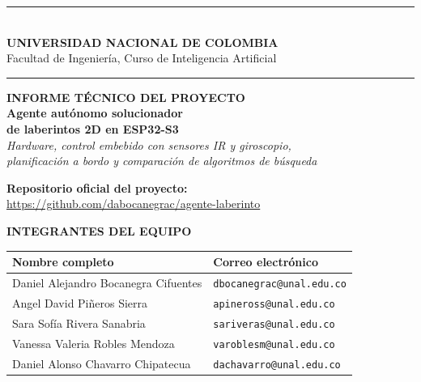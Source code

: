 \begin{titlepage}
  \thispagestyle{empty}
  \centering

  {\color{unalverde}\rule{\textwidth}{2.5pt}}\\[0.35cm]
  {\large\bfseries\color{unalverde} UNIVERSIDAD NACIONAL DE COLOMBIA}\\[0.15cm]
  {\normalsize\color{gristexto} Facultad de Ingeniería, Curso de Inteligencia Artificial}\\[0.25cm]
  {\color{grisborde}\rule{\textwidth}{0.8pt}}

  \vspace{2.2cm}

  {\Large\color{azulclaro}\bfseries INFORME TÉCNICO DEL PROYECTO}\\[0.5cm]

  {\Huge\bfseries\color{azuldoc} Agente autónomo solucionador\\[0.25cm] de laberintos 2D en ESP32-S3}\\[0.6cm]

  {\large\itshape Hardware, control embebido con sensores IR y giroscopio,\\
  planificación a bordo y comparación de algoritmos de búsqueda}

  \vspace{1.6cm}

  \begin{tcolorbox}[
    colback=azulfondo,
    colframe=azuldoc,
    arc=4pt,
    boxrule=0.8pt,
    width=0.92\textwidth,
    halign=center
  ]
    \textbf{\color{azuldoc} Repositorio oficial del proyecto:}\\[2pt]
    \url{https://github.com/dabocanegrac/agente-laberinto}
  \end{tcolorbox}

  \vspace{1.4cm}

  {\normalsize\bfseries\color{azuldoc} INTEGRANTES DEL EQUIPO}\\[0.45cm]
  \begin{tabular}{ll}
    \toprule
    \textbf{Nombre completo} & \textbf{Correo electrónico} \\
    \midrule
    Daniel Alejandro Bocanegra Cifuentes & \texttt{dbocanegrac@unal.edu.co} \\
    Angel David Piñeros Sierra           & \texttt{apineross@unal.edu.co} \\
    Sara Sofía Rivera Sanabria           & \texttt{sariveras@unal.edu.co} \\
    Vanessa Valeria Robles Mendoza       & \texttt{varoblesm@unal.edu.co} \\
    Daniel Alonso Chavarro Chipatecua    & \texttt{dachavarro@unal.edu.co} \\
    \bottomrule
  \end{tabular}


\end{titlepage}
